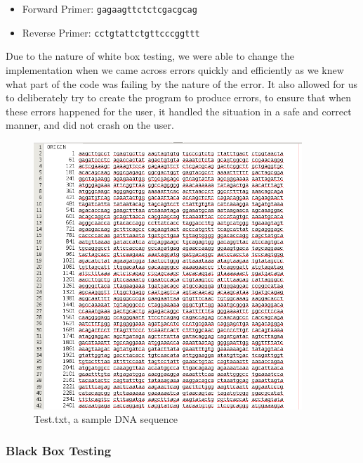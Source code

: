 \begin{itemize}
\item Forward Primer: \texttt{gagaagttctctcgacgcag}
\item Reverse Primer: \texttt{cctgtattctgttcccggttt}
\end{itemize}

Due to the nature of white box testing, we were able to change the
implementation when we came across errors quickly and efficiently as
we knew what part of the code was failing by the nature of the error.
It also allowed for us to deliberately try to create the program to
produce errors, to ensure that when these errors happened for the user,
it handled the situation in a safe and correct manner, and did not crash on the user.

\begin{figure}[h]
  \begin{center}
   \includegraphics[width=0.9\textwidth]{./images/demoBuild/test.png}
   \caption{
     \label{fig:demoBuild:test}
     Test.txt, a sample DNA sequence
    }
\end{center}
\end{figure}

\subsubsection{Black Box Testing}

